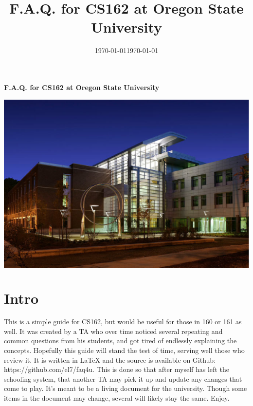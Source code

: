\documentclass[letterpaper,10pt,titlepage,fleqn]{article}
\title{F.A.Q. for CS162 at Oregon State University}
\date{\today}
\begin{document}
\begin{titlepage}
    \centering
    \vfill
    {\bfseries\Large
		F.A.Q. for CS162 at Oregon State University
        \vskip2cm
		\date{\today}

	}    
    \vfill
     \includegraphics[width=15cm]{images/kelley1.eps} %
    \vfill
    \vfill
\end{titlepage}








\tableofcontents

\newpage

\section{Intro}
This is a simple guide for CS162, but would be useful for those in 160 or 161
as well. It was created by a TA who over time noticed several repeating and
common questions from his students, and got tired of endlessly explaining the
concepts. Hopefully this guide will stand the test of time, serving well those
who review it. It is written in LaTeX and the source is available on Github: 
https://github.com/el7/faq4u. This is done so that after myself has left the
schooling system, that another TA may pick it up and update any changes that
come to play. It's meant to be a living document for the university. Though some
items in the document may change, several will likely stay the same. Enjoy.
\end{document}
